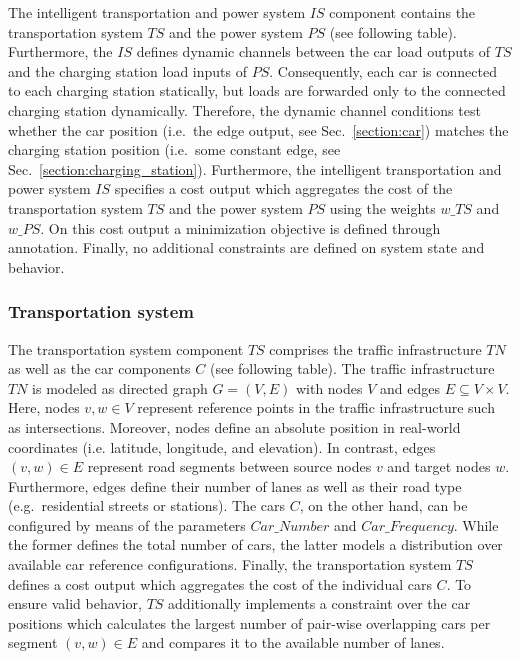 The intelligent transportation and power system $IS$ component contains the transportation system $TS$ and the power system $PS$ (see following table). Furthermore, the $IS$ defines dynamic channels between the car load outputs of $TS$ and the charging station load inputs of $PS$. Consequently, each car is connected to each charging station statically, but loads are forwarded only to the connected charging station dynamically. Therefore, the dynamic channel conditions test whether the car position (i.e.\ the edge output, see Sec.~\ref{section:car}) matches the charging station position (i.e.\ some constant edge, see Sec.~\ref{section:charging_station}). Furthermore, the intelligent transportation and power system $IS$ specifies a cost output which aggregates the cost of the transportation system $TS$ and the power system $PS$ using the weights $w\_TS$ and $w\_PS$. On this cost output a minimization objective is defined through annotation. Finally, no additional constraints are defined on system state and behavior.

\subsubsection*{Transportation system}

The transportation system component $TS$ comprises the traffic infrastructure $TN$ as well as the car components $C$ (see following table). The traffic infrastructure $TN$ is modeled as directed graph $G = (V,E)$ with nodes $V$ and edges $E \subseteq V \times V$. Here, nodes $v,w \in V$ represent reference points in the traffic infrastructure such as intersections. Moreover, nodes define an absolute position in real-world coordinates (i.e. latitude, longitude, and elevation). In contrast, edges $(v,w) \in E$ represent road segments between source nodes $v$ and target nodes $w$. Furthermore, edges define their number of lanes as well as their road type (e.g.\ residential streets or stations). The cars $C$, on the other hand, can be configured by means of the parameters $Car\_Number$ and $Car\_Frequency$. While the former defines the total number of cars, the latter models a distribution over available car reference configurations. Finally, the transportation system $TS$ defines a cost output which aggregates the cost of the individual cars $C$. To ensure valid behavior, $TS$ additionally implements a constraint over the car positions which calculates the largest number of pair-wise overlapping cars per segment $(v,w) \in E$ and compares it to the available number of lanes.

